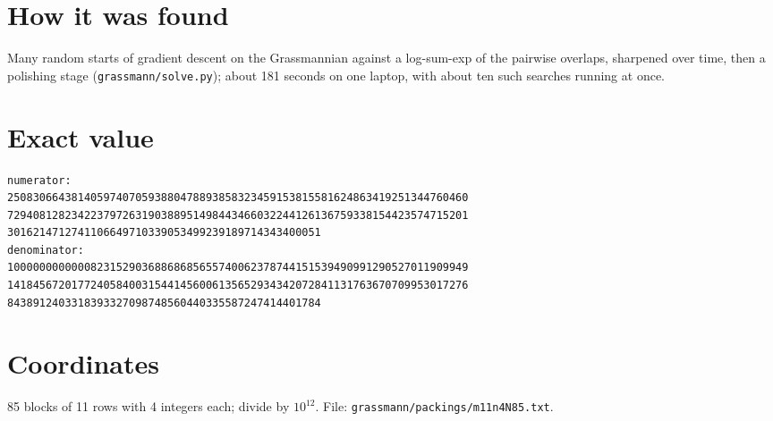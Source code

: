 \documentclass[11pt,a4paper]{article}
\begin{document}
\section{How it was found}
Many random starts of gradient descent on the Grassmannian against a log-sum-exp of the pairwise overlaps, sharpened over time, then a polishing stage (\texttt{grassmann/solve.py}); about 181 seconds on one laptop, with about ten such searches running at once.


\appendix
\section{Exact value}
{\small
\begin{verbatim}
numerator:
250830664381405974070593880478893858323459153815581624863419251344760460
729408128234223797263190388951498443466032244126136759338154423574715201
3016214712741106649710339053499239189714343400051
denominator:
100000000000082315290368868685655740062378744151539490991290527011909949
141845672017724058400315441456006135652934342072841131763670709953017276
8438912403318393327098748560440335587247414401784
\end{verbatim}}

\section{Coordinates}
85 blocks of 11 rows with 4 integers each; divide by $10^{12}$. File: \texttt{grassmann/packings/m11n4N85.txt}.
{\tiny
\begin{multicols}{3}
\end{multicols}}
\end{document}
